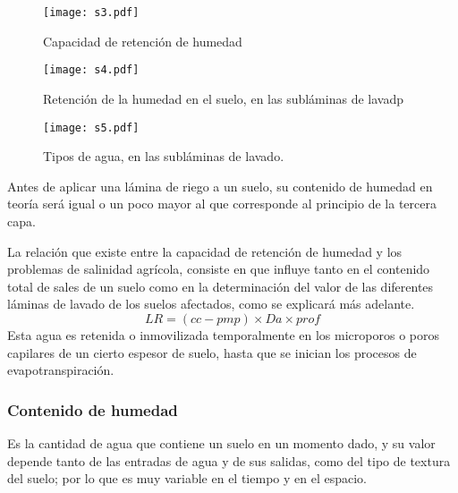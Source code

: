\begin{figure}[h!]
\centering
\texttt{[image: s3.pdf]}
\caption{Capacidad de retención de humedad}
\label{s3}
\end{figure}
\begin{figure}[h!]
\centering
\texttt{[image: s4.pdf]}
\caption{Retención de la humedad en el suelo, en las subláminas de lavadp}
\label{s4}
\end{figure}
\begin{figure}[h!]
\centering
\texttt{[image: s5.pdf]}
\caption{Tipos de agua, en las subláminas de lavado.}
\label{s5}
\end{figure}
Antes de aplicar una lámina de riego a un suelo, su contenido de humedad en teoría será igual o un poco mayor al que corresponde al principio de la tercera capa.

La relación que existe entre la capacidad de retención de humedad y los problemas de salinidad agrícola, consiste en que influye tanto en el contenido total de sales de un suelo como en la determinación del valor de las diferentes láminas de lavado de los suelos afectados, como se explicará más adelante.
\begin{equation}
LR = (cc-pmp) \times  Da \times prof 
\end{equation}
Esta agua es retenida o inmovilizada temporalmente en los microporos o poros capilares de un cierto espesor de suelo, hasta que se inician los procesos de evapotranspiración.

\subsubsection{Contenido de humedad}
Es la cantidad de agua que contiene un suelo en un momento dado, y su valor depende tanto de las entradas de agua y de sus salidas, como del tipo de textura del suelo; por lo que es muy variable en el tiempo y en el espacio.

